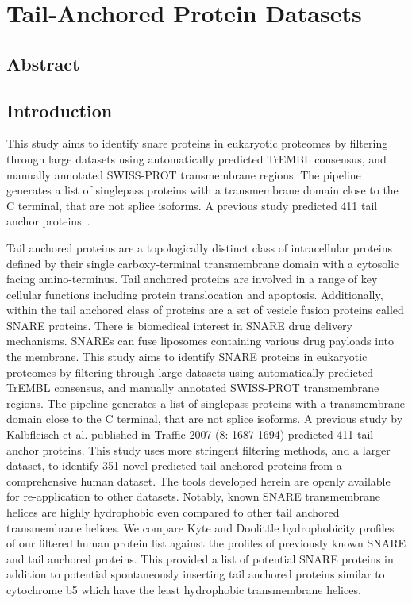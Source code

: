 \chapter{Tail-Anchored Protein Datasets}
\sloppy
\section{Abstract}

\section{Introduction}
This study aims to identify \gls{snare} proteins in eukaryotic proteomes by filtering through large datasets using automatically predicted TrEMBL consensus, and manually annotated SWISS-PROT transmembrane regions.
The pipeline generates a list of singlepass proteins with a transmembrane domain close to the C terminal, that are not splice isoforms.
A previous study predicted 411 tail anchor proteins~\cite{Kalbfleisch2007}.

Tail anchored proteins are a topologically distinct class of intracellular proteins defined by their single carboxy-terminal transmembrane domain with a cytosolic facing amino-terminus.
Tail anchored proteins are involved in a range of key cellular functions including protein translocation and apoptosis.
Additionally, within the tail anchored class of proteins are a set of vesicle fusion proteins called SNARE proteins.
There is biomedical interest in SNARE drug delivery mechanisms.
SNAREs can fuse liposomes containing various drug payloads into the membrane.
This study aims to identify SNARE proteins in eukaryotic proteomes by filtering through large datasets using automatically predicted TrEMBL consensus, and manually annotated SWISS-PROT transmembrane regions.
The pipeline generates a list of singlepass proteins with a transmembrane domain close to the C terminal, that are not splice isoforms.
A previous study by Kalbfleisch et al.
published in Traffic 2007 (8: 1687-1694) predicted 411 tail anchor proteins.
This study uses more stringent filtering methods, and a larger dataset, to identify 351 novel predicted tail anchored proteins from a comprehensive human dataset.
The tools developed herein are openly available for re-application to other datasets.
Notably, known SNARE transmembrane helices are highly hydrophobic even compared to other tail anchored transmembrane helices.
We compare Kyte and Doolittle hydrophobicity profiles of our filtered human protein list against the profiles of previously known SNARE and tail anchored proteins.
This provided a list of potential SNARE proteins in addition to potential spontaneously inserting tail anchored proteins similar to cytochrome b5 which have the least hydrophobic transmembrane helices.

